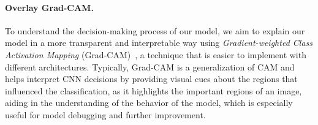 \paragraph{Overlay Grad-CAM.}
To understand the decision-making process of our model, 
we aim to explain our model in a more transparent and interpretable way using 
\textit{Gradient-weighted Class Activation Mapping} (Grad-CAM)~\cite{SelvarajuCDVPB17}, 
a technique that is easier to implement with different architectures. 
Typically, 
Grad-CAM is a generalization of CAM and helps interpret CNN decisions by providing visual cues about the regions that influenced the classification, 
as it highlights the important regions of an image, 
aiding in the understanding of the behavior of the model, 
which is especially useful for model debugging and further improvement. 

